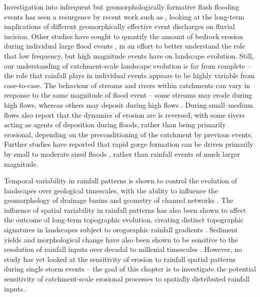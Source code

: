 Investigation into infrequent but geomorphologically formative flash flooding events has seen a resurgence by recent work such as \citet{Huang2006}, looking at the long-term implications of different geomorphically effective event discharges on fluvial incision. Other studies have sought to quantify the amount of bedrock erosion during individual large flood events \citep[e.g.][]{gupta2007catastrophic,lamb2010rapid,baynes2015erosion}, in an effort to better understand the role that low frequency, but high magnitude events have on landscape evolution. Still, our understanding of catchment-scale landscape evolution is far from complete -- the role that rainfall plays in individual events appears to be highly variable from case-to-case. The behaviour of streams and rivers within catchments can vary in response to the same magnitude of flood event -- some streams may erode during high flows, whereas others may deposit during high flows \citep{turowski2013large}. During small--medium flows \citet{turowski2013large} also report that the dynamics of erosion are is reversed, with some rivers acting as agents of deposition during floods, rather than being primarily erosional, depending on the preconditioning of the catchment by previous events. Further studies have reported that rapid gorge formation can be driven primarily by small to moderate sized floods \citep{anton2015exceptional}, rather than rainfall events of much larger magnitude.

Temporal variability in rainfall patterns is shown to control the evolution of landscapes over geological timescales, with the ability to influence the geomorphology of drainage basins and geometry of channel networks \citep{Tucker2000,Solyom2004}. The influence of spatial variability in rainfall patterns has also been shown to affect the outcome of long-term topographic evolution, creating distinct topographic signatures in landscapes subject to orogoraphic rainfall gradients \citep{solyom2007importance,han2014modeling,han2015measuring}. Sediment yields and morphological change have also been shown to be sensitive to the resolution of rainfall inputs over decadal to millenial timescales \citep{coulthard2016sensitivity}. However, no study has yet looked at the sensitivity of erosion to rainfall spatial patterns during single storm events -- the goal of this chapter is to investigate the potential sensitivity of catchment-scale erosional processes to spatially distributed rainfall inputs.

